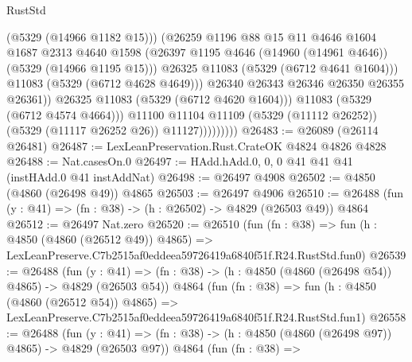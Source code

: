\begin{lexlean}{RustStd}
\begin{coremodule}
                                  (@5329 (@14966 @1182 @15)))
                                (@26259
                                  @1196
                                  @88
                                  @15
                                  @11
                                  @4646
                                  @1604
                                  @1687
                                  @2313
                                  @4640
                                  @1598
                                  (@26397
                                    @1195
                                    @4646
                                    (@14960 (@14961 @4646))
                                    (@5329 (@14966 @1195 @15)))
                                  @26325
                                  @11083
                                  (@5329 (@6712 @4641 @1604)))
                                @11083
                                (@5329 (@6712 @4628 @4649)))
                              @26340
                              @26343
                              @26346
                              @26350
                              @26355
                              @26361))
                          @26325
                          @11083
                          (@5329 (@6712 @4620 @1604)))
                        @11083
                        (@5329 (@6712 @4574 @4664)))
                      @11100
                      @11104
                      @11109
                      (@5329 (@11112 @26252))
                      (@5329 (@11117 @26252 @26))
                      @11127)))))))))
@26483 := @26089 (@26114 @26481)
@26487 := LexLeanPreservation.Rust.CrateOK @4824 @4826 @4828
@26488 := Nat.casesOn.{0}
@26497 := HAdd.hAdd.{0, 0, 0} @41 @41 @41 (instHAdd.{0} @41 instAddNat)
@26498 := @26497 @4908
@26502 := @4850 (@4860 (@26498 @49)) @4865
@26503 := @26497 @4906
@26510 := @26488 (fun (y : @41) => (fn : @38) -> (h : @26502) -> @4829 (@26503 @49)) @4864
@26512 := @26497 Nat.zero
@26520 := @26510
    (fun (fn : @38) =>
    fun (h : @4850 (@4860 (@26512 @49)) @4865) =>
    LexLeanPreserve.C7b2515af0eddeea59726419a6840f51f.R24.RustStd.fun0)
@26539 := @26488
    (fun (y : @41) => (fn : @38) -> (h : @4850 (@4860 (@26498 @54)) @4865) -> @4829 (@26503 @54))
    @4864
    (fun (fn : @38) =>
    fun (h : @4850 (@4860 (@26512 @54)) @4865) =>
    LexLeanPreserve.C7b2515af0eddeea59726419a6840f51f.R24.RustStd.fun1)
@26558 := @26488
    (fun (y : @41) => (fn : @38) -> (h : @4850 (@4860 (@26498 @97)) @4865) -> @4829 (@26503 @97))
    @4864
    (fun (fn : @38) =>

\end{coremodule}
\end{lexlean}
